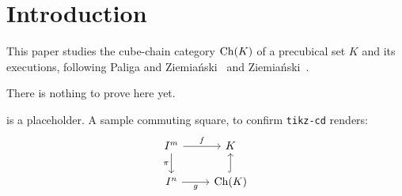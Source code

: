 \documentclass[../main.tex]{subfiles}
\begin{document}
\section{Introduction}
\label{sec:introduction}


This paper studies the cube-chain category $\operatorname{Ch}(K)$ of a precubical set $K$
and its executions, following Paliga and Ziemia\'nski~\cite{PZ} and
Ziemia\'nski~\cite{Z}.

\begin{theorem}[placeholder]
\label{thm:placeholder}
There is nothing to prove here yet.
\end{theorem}

 is a placeholder. A sample commuting square, to confirm
\texttt{tikz-cd} renders:
\[
\begin{tikzcd}
  \cube{m} \arrow[r, "f"] \arrow[d, "\pi"'] & K \\
  \cube{n} \arrow[r, "g"'] & \Ch(K) \arrow[u, hook]
\end{tikzcd}
\]
\end{document}

